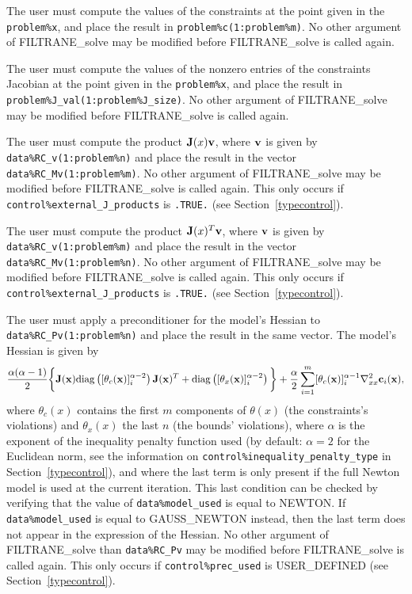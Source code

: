 \documentclass{galahad}
\newcommand{\packagename}{FILTRANE}
\newcommand{\sym}{\sf\small}
\begin{document}
\begin{description}
 The user must compute the values of the constraints at the
point given in the {\tt problem\%x}, and place the result
in {\tt problem\%c(1:problem\%m)}.
No other argument of \packagename\_solve may be modified
before \packagename\_solve is called again.

 The user must compute the values of the nonzero entries of the
constraints Jacobian at the point given in the {\tt problem\%x}, and place
the result in {\tt problem\%J\_val(1:problem\%J\_size)}.
No other argument of \packagename\_solve may be modified
before \packagename\_solve is called again.

 The user must compute the product ${\mathbf{J}}(x) {\mathbf{v}}$, where
${\mathbf{v}}$ is given by {\tt data\%RC\_v(1:problem\%n)} and place the result in
the vector {\tt data\%RC\_Mv(1:problem\%m)}. No other argument of
\packagename\_solve may be modified before \packagename\_solve is called
again.
This only occurs if {\tt control\%external\_J\_products} is {\tt .TRUE.}
(see Section~\ref{typecontrol}).

 The user must compute the product ${\mathbf{J}}(x)^T {\mathbf{v}}$, where
${\mathbf{v}}$ is given by {\tt data\%RC\_v(1:problem\%m)} and place the result in
the vector {\tt data\%RC\_Mv(1:problem\%n)}. No other argument of
\packagename\_solve may be modified before \packagename\_solve is called
again.
This only occurs if {\tt control\%external\_J\_products} is {\tt .TRUE.}
(see Section~\ref{typecontrol}).

 The user must apply a
preconditioner for the model's Hessian to {\tt data\%RC\_Pv(1:problem\%n)} and
place the result in the same vector.  The model's Hessian is given by
\[
\frac{\alpha(\alpha - 1)}{2} \bigg\{
{\mathbf{J}}({\mathbf{x}}) {\rm diag}\left([\theta_c({\mathbf{x}})]_i^{\alpha-2}\right) {\mathbf{J}}({\mathbf{x}})^T
+ {\rm diag}\left( [\theta_x({\mathbf{x}})]_i^{\alpha-2} \right)
\bigg\}
+ \frac{\alpha}{2} \sum_{i=1}^m [\theta_c({\mathbf{x}})]_i^{\alpha-1}
  \nabla_{xx}^2 {\mathbf{c}}_i({\mathbf{x}}),
\]
where $\theta_c(x)$ contains the first $m$ components of $\theta(x)$ (the
constraints's violations) and $\theta_x(x)$ the last $n$ (the bounds'
violations), where $\alpha$ is the exponent of the inequality penalty
function used (by default: $\alpha = 2$ for the Euclidean norm, see the
information on {\tt control\%inequality\_penalty\_type} in
Section~\ref{typecontrol}), and where the last term is only present if the full
Newton model is used at the current iteration.  This last condition can be
checked by verifying that the value of {\tt data\%model\_used} is equal to
{\sym NEWTON}. If {\tt data\%model\_used} is equal to {\sym GAUSS\_NEWTON}
instead, then the last term does not appear in the expression of the Hessian.
No other argument of \packagename\_solve than {\tt data\%RC\_Pv} may be
modified  before \packagename\_solve is called again.
This only occurs if {\tt control\%prec\_used} is {\sym USER\_DEFINED}
(see Section~\ref{typecontrol}).


\end{description}
\end{document}
